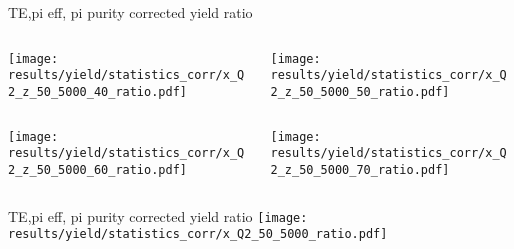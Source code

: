 \begin{frame}{TE,pi eff, pi purity corrected yield ratio}
\begin{columns}
\begin{column}[T]{0.5\textwidth}
\texttt{[image: results/yield/statistics\_corr/x\_Q2\_z\_50\_5000\_40\_ratio.pdf]}
\end{column}
\begin{column}[T]{0.5\textwidth}
\texttt{[image: results/yield/statistics\_corr/x\_Q2\_z\_50\_5000\_50\_ratio.pdf]}
\end{column}
\end{columns}
\begin{columns}
\begin{column}[T]{0.5\textwidth}
\texttt{[image: results/yield/statistics\_corr/x\_Q2\_z\_50\_5000\_60\_ratio.pdf]}
\end{column}
\begin{column}[T]{0.5\textwidth}
\texttt{[image: results/yield/statistics\_corr/x\_Q2\_z\_50\_5000\_70\_ratio.pdf]}
\end{column}
\end{columns}
\end{frame}
\begin{frame}{TE,pi eff, pi purity corrected yield ratio}
\texttt{[image: results/yield/statistics\_corr/x\_Q2\_50\_5000\_ratio.pdf]}
\end{frame}
